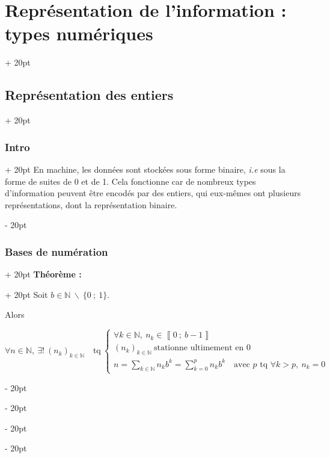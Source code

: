 \documentclass[a4paper, 12pt, twoside]{article}
\newcommand{\N}{\mathbb{N}} %
\newcommand{\nset}[2]{\left\llbracket #1\ ;\ #2 \right\rrbracket}
\newcommand{\ind}[1][20pt]{\advance\leftskip + #1}
\newcommand{\deind}[1][20pt]{\advance\leftskip - #1}
\newenvironment{indentedenv}[1][20pt]{\par \ind[#1]}{\par \deind}
\newenvironment{indt}[2][20pt]{#2 \begin{indentedenv}[#1]}{\end{indentedenv}} %
\begin{document}
    \begin{indt}{\section{Représentation de l'information : types numériques}}
        
        \begin{indt}{\subsection{Représentation des entiers}}
            \begin{indt}{\subsubsection{Intro}}
                En machine, les données sont stockées sous forme binaire, \textit{i.e} sous la forme de suites de 0 et de 1. Cela fonctionne car de nombreux types d'information peuvent être encodés par des entiers, qui eux-mêmes ont plusieurs représentations, dont la représentation binaire.
            \end{indt}
            
            \vspace{-12pt}
            
            \begin{indt}{\subsubsection{Bases de numération}}
                \begin{indt}{\textbf{Théorème :}}
                    Soit $b \in \N\ \backslash\ \{0\ ;\ 1\}$.
                    
                    Alors
                    
                    $
                        \forall n \in \N,\ \exists!\ (n_k)_{k \in \N}
                        \quad \text{tq}\ 
                        \begin{cases}
                            \forall k \in \N,\ n_k \in \nset{0}{b-1}
                            \\
                            (n_k)_{k \in \N}\ \text{stationne ultimement en } 0
                            \\
                            \displaystyle n = \sum_{k \in \N} n_k b^k = \sum_{k = 0}^p n_k b^k \quad \text{avec $p$ tq } \forall k > p,\ n_k = 0
                        \end{cases}
                    $
                    

\end{indt}
\end{indt}
\end{indt}
\end{indt}
\end{document}

